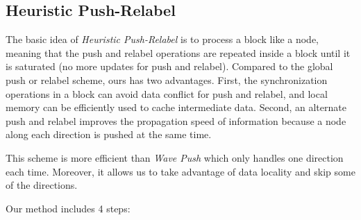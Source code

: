 \subsection{Heuristic Push-Relabel}
\label{section hpr}

The basic idea of \textit{Heuristic Push-Relabel} is to process a block like a node, meaning that the push and relabel operations are repeated inside a block until it is saturated (no more updates for push and relabel).
Compared to the global push or relabel scheme, ours has two advantages.
First, the synchronization operations in a block can avoid data conflict for push and relabel, and local memory can be efficiently used to cache intermediate data.
Second, an alternate push and relabel improves the propagation speed of information because a node along each direction is pushed at the same time.

This scheme is more efficient than \textit{Wave Push} which only handles one direction each time.
Moreover, it allows us to take advantage of data locality and skip some of the directions.

Our method includes 4 steps:

